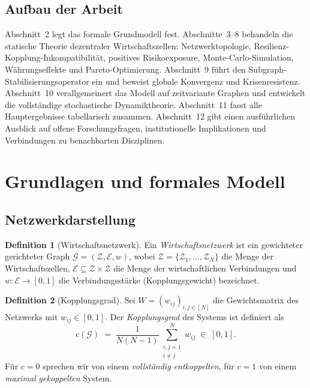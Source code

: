 ﻿\documentclass[a4paper,12pt]{article}
\theoremstyle{definition}
\newtheorem{definition}{Definition}
\begin{document}
\subsection{Aufbau der Arbeit}

Abschnitt~2 legt das formale Grundmodell fest. Abschnitte~3--8 behandeln die statische
Theorie dezentraler Wirtschaftszellen: Netzwerktopologie, Resilienz-Kopplung-Inkompatibilität,
positives Risikoexposure, Monte-Carlo-Simulation, Währungseffekte und Pareto-Optimierung.
Abschnitt~9 führt den Subgraph-Stabilisierungsoperator ein und beweist globale Konvergenz
und Krisenresistenz. Abschnitt~10 verallgemeinert das Modell auf zeitvariante Graphen und
entwickelt die vollständige stochastische Dynamiktheorie. Abschnitt~11 fasst alle
Hauptergebnisse tabellarisch zusammen. Abschnitt~12 gibt einen ausführlichen Ausblick auf
offene Forschungsfragen, institutionelle Implikationen und Verbindungen zu benachbarten
Disziplinen.

\section{Grundlagen und formales Modell}

\subsection{Netzwerkdarstellung}

\begin{definition}[Wirtschaftsnetzwerk]
    Ein \emph{Wirtschaftsnetzwerk} ist ein gewichteter gerichteter Graph
    $\mathcal{G} = (\mathcal{Z}, \mathcal{E}, w)$, wobei
    $\mathcal{Z} = \{\mathcal{Z}_1, \ldots, \mathcal{Z}_N\}$ die Menge der Wirtschaftszellen,
    $\mathcal{E} \subseteq \mathcal{Z} \times \mathcal{Z}$ die Menge der wirtschaftlichen
    Verbindungen und $w : \mathcal{E} \to [0,1]$ die Verbindungsstärke (Kopplungsgewicht)
    bezeichnet.
\end{definition}

\begin{definition}[Kopplungsgrad]
\label{def:kopplungsgrad}
    Sei $W = (w_{ij})_{i,j \in [N]}$ die Gewichtsmatrix des Netzwerks mit $w_{ij} \in [0,1]$.
    Der \emph{Kopplungsgrad} des Systems ist definiert als
    \[
        c(\mathcal{G}) \;=\; \frac{1}{N(N-1)} \sum_{\substack{i,j=1\\i\neq j}}^{N} w_{ij}
        \;\in\; [0,1].
    \]
    Für $c = 0$ sprechen wir von einem \emph{vollständig entkoppelten}, für $c = 1$ von einem
    \emph{maximal gekoppelten} System.
\end{definition}
\end{document}
